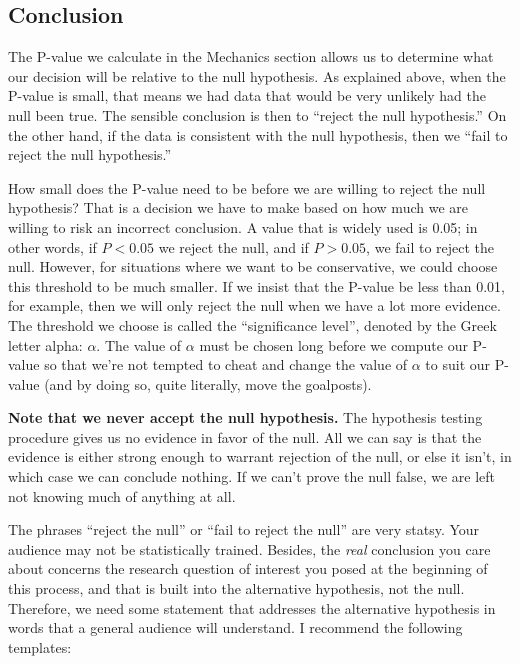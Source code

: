 \documentclass[
]{book}
\begin{document}
\hypertarget{hypothesis1-ht-conclusion}{%
\subsection{Conclusion}\label{hypothesis1-ht-conclusion}}

The P-value we calculate in the Mechanics section allows us to determine what our decision will be relative to the null hypothesis. As explained above, when the P-value is small, that means we had data that would be very unlikely had the null been true. The sensible conclusion is then to ``reject the null hypothesis.'' On the other hand, if the data is consistent with the null hypothesis, then we ``fail to reject the null hypothesis.''

How small does the P-value need to be before we are willing to reject the null hypothesis? That is a decision we have to make based on how much we are willing to risk an incorrect conclusion. A value that is widely used is 0.05; in other words, if \(P < 0.05\) we reject the null, and if \(P > 0.05\), we fail to reject the null. However, for situations where we want to be conservative, we could choose this threshold to be much smaller. If we insist that the P-value be less than 0.01, for example, then we will only reject the null when we have a lot more evidence. The threshold we choose is called the ``significance level'', denoted by the Greek letter alpha: \(\alpha\). The value of \(\alpha\) must be chosen long before we compute our P-value so that we're not tempted to cheat and change the value of \(\alpha\) to suit our P-value (and by doing so, quite literally, move the goalposts).

\textbf{Note that we never accept the null hypothesis.} The hypothesis testing procedure gives us no evidence in favor of the null. All we can say is that the evidence is either strong enough to warrant rejection of the null, or else it isn't, in which case we can conclude nothing. If we can't prove the null false, we are left not knowing much of anything at all.

The phrases ``reject the null'' or ``fail to reject the null'' are very statsy. Your audience may not be statistically trained. Besides, the \emph{real} conclusion you care about concerns the research question of interest you posed at the beginning of this process, and that is built into the alternative hypothesis, not the null. Therefore, we need some statement that addresses the alternative hypothesis in words that a general audience will understand. I recommend the following templates:
\end{document}
